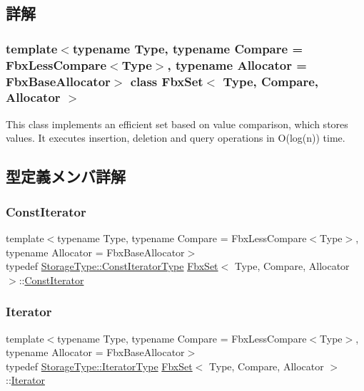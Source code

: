 \subsection{詳解}
\subsubsection*{template$<$typename Type, typename Compare = Fbx\+Less\+Compare$<$\+Type$>$, typename Allocator = Fbx\+Base\+Allocator$>$\newline
class Fbx\+Set$<$ Type, Compare, Allocator $>$}

This class implements an efficient set based on value comparison, which stores values. It executes insertion, deletion and query operations in O(log(n)) time. 

\subsection{型定義メンバ詳解}
\mbox{\label{class_fbx_set_af9aee2f7b6a6638b816ea95bd510928c}} 
\subsubsection{\texorpdfstring{Const\+Iterator}{ConstIterator}}
{\footnotesize\ttfamily template$<$typename Type, typename Compare = Fbx\+Less\+Compare$<$\+Type$>$, typename Allocator = Fbx\+Base\+Allocator$>$ \\
typedef \hyperlink{class_fbx_red_black_tree_a7309ae5e1bb24e7e3da94fef975d10c4}{Storage\+Type\+::\+Const\+Iterator\+Type} \hyperlink{class_fbx_set}{Fbx\+Set}$<$ Type, Compare, Allocator $>$\+::\hyperlink{class_fbx_set_af9aee2f7b6a6638b816ea95bd510928c}{Const\+Iterator}}

\mbox{\label{class_fbx_set_ad1b543e0f63f04f4d2dc8e9e3da9bcaa}} 
\subsubsection{\texorpdfstring{Iterator}{Iterator}}
{\footnotesize\ttfamily template$<$typename Type, typename Compare = Fbx\+Less\+Compare$<$\+Type$>$, typename Allocator = Fbx\+Base\+Allocator$>$ \\
typedef \hyperlink{class_fbx_red_black_tree_af7b6209131012ec5aa33e0286c956cd6}{Storage\+Type\+::\+Iterator\+Type} \hyperlink{class_fbx_set}{Fbx\+Set}$<$ Type, Compare, Allocator $>$\+::\hyperlink{class_fbx_set_ad1b543e0f63f04f4d2dc8e9e3da9bcaa}{Iterator}}

